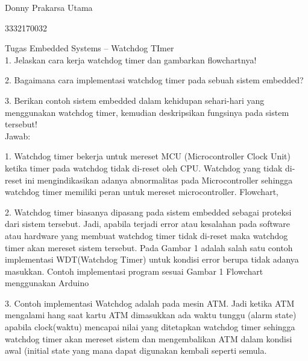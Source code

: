 \documentclass{article}
\begin{document}
Donny Prakarsa Utama

3332170032

Tugas Embedded Systems – Watchdog TImer\\

1.	Jelaskan cara kerja watchdog timer dan gambarkan flowchartnya! 

2.	Bagaimana cara implementasi watchdog timer pada sebuah sistem embedded? 

3.	Berikan contoh sistem embedded dalam kehidupan sehari-hari yang menggunakan watchdog timer, kemudian deskripsikan fungsinya pada sistem tersebut!\\

Jawab:

1.	Watchdog timer bekerja untuk mereset MCU (Microcontroller Clock Unit) ketika timer pada watchdog tidak di-reset oleh CPU. Watchdog yang tidak di-reset ini mengindikasikan adanya abnormalitas pada Microcontroller sehingga watchdog timer memiliki peran untuk mereset microcontroller.
Flowchart,

2.	Watchdog timer biasanya dipasang pada sistem embedded sebagai proteksi dari sistem tersebut. Jadi, apabila terjadi error atau kesalahan pada software atau hardware yang membuat watchdog timer tidak di-reset maka watchdog timer akan mereset sistem tersebut. Pada Gambar 1 adalah salah satu contoh implementasi WDT(Watchdog Timer) untuk kondisi error berupa tidak adanya masukkan. 
Contoh implementasi program sesuai Gambar 1 Flowchart menggunakan Arduino

3.	Contoh implementasi Watchdog adalah pada mesin ATM. Jadi ketika ATM mengalami hang saat kartu ATM dimasukkan ada waktu tunggu (alarm state) apabila clock(waktu) mencapai nilai yang ditetapkan watchdog timer sehingga watchdog timer akan mereset sistem dan mengembalikan ATM dalam kondisi awal (initial state yang mana dapat digunakan kembali seperti semula.



\end{document}
